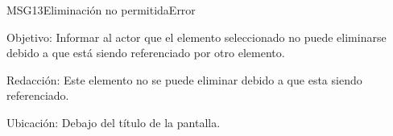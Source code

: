 \begin{mensaje}{MSG13}{Eliminación no permitida}{Error}
	\item [Objetivo:] Informar al actor que el elemento seleccionado no puede eliminarse debido a que está siendo referenciado por otro elemento.
	\item[Redacción:] Este elemento no se puede eliminar debido a que esta siendo referenciado.
	\item [Ubicación:] Debajo del título de la pantalla.
\end{mensaje}